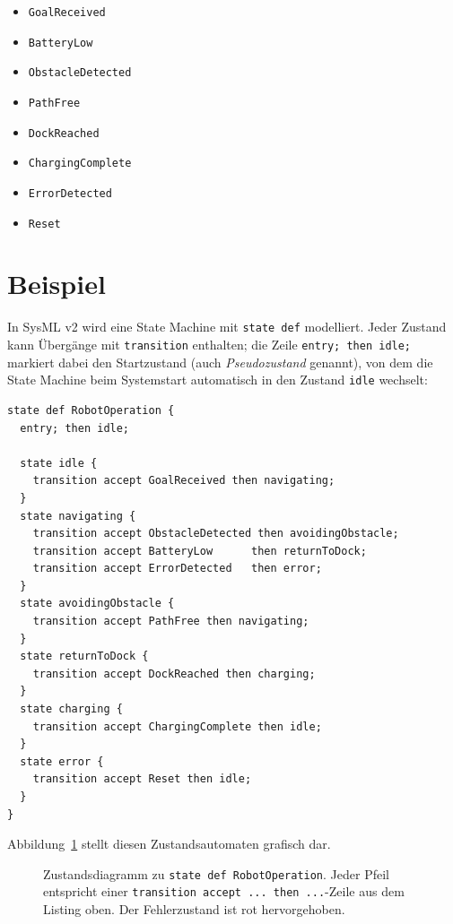\begin{itemize}
    \item \texttt{GoalReceived}
    \item \texttt{BatteryLow}
    \item \texttt{ObstacleDetected}
    \item \texttt{PathFree}
    \item \texttt{DockReached}
    \item \texttt{ChargingComplete}
    \item \texttt{ErrorDetected}
    \item \texttt{Reset}
\end{itemize}

\section{Beispiel}
In SysML v2 wird eine State Machine mit \texttt{state def} modelliert. Jeder Zustand
kann Übergänge mit \texttt{transition} enthalten; die Zeile \texttt{entry; then idle;} markiert dabei den Startzustand (auch \emph{Pseudozustand} genannt), von dem die State Machine beim Systemstart automatisch in den Zustand \texttt{idle} wechselt:

\begin{lstlisting}
state def RobotOperation {
  entry; then idle;

  state idle {
    transition accept GoalReceived then navigating;
  }
  state navigating {
    transition accept ObstacleDetected then avoidingObstacle;
    transition accept BatteryLow      then returnToDock;
    transition accept ErrorDetected   then error;
  }
  state avoidingObstacle {
    transition accept PathFree then navigating;
  }
  state returnToDock {
    transition accept DockReached then charging;
  }
  state charging {
    transition accept ChargingComplete then idle;
  }
  state error {
    transition accept Reset then idle;
  }
}
\end{lstlisting}

Abbildung~\ref{fig:state-machine} stellt diesen Zustandsautomaten grafisch dar.

\begin{figure}[H]
  \centering
  \caption{Zustandsdiagramm zu \texttt{state def RobotOperation}. Jeder
    Pfeil entspricht einer \texttt{transition accept ... then ...}-Zeile
    aus dem Listing oben. Der Fehlerzustand ist rot hervorgehoben.}
  \label{fig:state-machine}
\end{figure}

